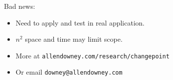 \documentclass[pdf,letterpaper,allen]{prosper}
\begin{document}
\begin{slide}{}

Bad news:

\begin{itemize}

\item Need to apply and test in real application.

\item $n^2$ space and time may limit scope.

\end{itemize}

\end{slide}


\begin{slide}{}

\begin{itemize}

\item More at {\tt allendowney.com/research/changepoint}

\item Or email {\tt downey@allendowney.com}


\end{itemize}


\end{slide}
\end{document}
